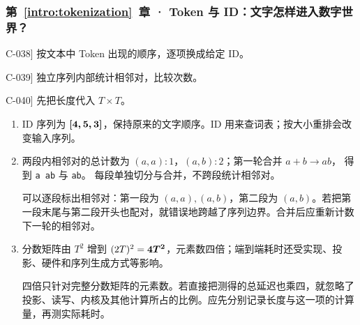 \subsubsection*{第~\ref*{intro:tokenization}~章 · Token 与 ID：文字怎样进入数字世界？}
\begin{answerhints}
\item[\hyperref[exercise:token-id-lookup]{C-038}] \leavevmode{}\label{hint:token-id-lookup}按文本中 Token 出现的顺序，逐项换成给定 ID。
\item[\hyperref[exercise:bpe-pair-merge]{C-039}] \leavevmode{}\label{hint:bpe-pair-merge}独立序列内部统计相邻对，比较次数。
\item[\hyperref[exercise:tokenizer-attention-cost]{C-040}] \leavevmode{}\label{hint:tokenizer-attention-cost}先把长度代入 $T\times T$。
\end{answerhints}
\begin{enumerate}[label={},leftmargin=4.8em,itemsep=4pt]
\item[\textbf{\hyperref[exercise:token-id-lookup]{C-038.}}] \leavevmode{}\label{solution:C-038}\label{solution:token-id-lookup}ID 序列为 $\boldsymbol{[4,5,3]}$，保持原来的文字顺序。ID 用来查词表；按大小重排会改变输入序列。
\item[\textbf{\hyperref[exercise:bpe-pair-merge]{C-039.}}] \leavevmode{}\label{solution:C-039}\label{solution:bpe-pair-merge}两段内相邻对的总计数为
$(a,a):1$，$(a,b):2$；第一轮合并 $a+b\to ab$，
得到 \texttt{a ab} 与 \texttt{ab}。
每段单独切分与合并，不跨段统计相邻对。\par 可以逐段标出相邻对：第一段为 $(a,a),(a,b)$，第二段为 $(a,b)$。若把第一段末尾与第二段开头也配对，就错误地跨越了序列边界。合并后应重新计数下一轮的相邻对。
\item[\textbf{\hyperref[exercise:tokenizer-attention-cost]{C-040.}}] \leavevmode{}\label{solution:C-040}\label{solution:tokenizer-attention-cost}分数矩阵由 $T^2$ 增到 $(2T)^2=\boldsymbol{4T^2}$，元素数四倍；端到端耗时还受实现、投影、硬件和序列生成方式等影响。\par 四倍只针对完整分数矩阵的元素数。若直接把测得的总延迟也乘四，就忽略了投影、读写、内核及其他计算所占的比例。应先分别记录长度与这一项的计算量，再测实际耗时。
\end{enumerate}
